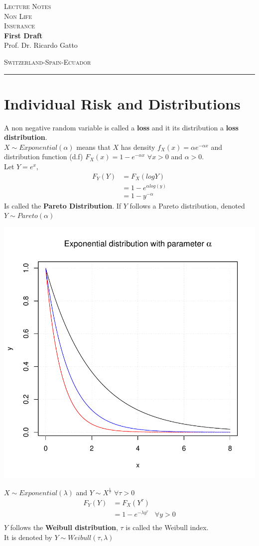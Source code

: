 \documentclass[11pt,a4paper,oneside]{article}
\newcommand*{\titleBOOK}{\begingroup
\centering
\vspace*{\baselineskip}
\vspace*{\baselineskip}
{\Huge\scshape Lecture Notes}\\[10mm]
{\Huge\scshape Non Life  \\[5mm]
Insurance} \\ [\baselineskip]
{\Large\bfseries First Draft}\\[0.3 \textheight]
{\Large Prof. Dr. Ricardo Gatto}\\
\vfill
\begin{center}
{\scshape Switzerland-Spain-Ecuador}\\
\rule{\textwidth}{0.5pt}
\end{center}
\vspace*{\baselineskip}
\endgroup}
\begin{document}

\titleBOOK
\newpage

\tableofcontents
\newpage


\section{Individual Risk and Distributions}
A non negative random variable is called a \textbf{loss} and it its distribution a \textbf{loss distribution}.\\
$X\sim Exponential(\alpha)$ means that $X$ has density $f_X(x)=\alpha e^{-\alpha x}$ and distribution function (d.f) $F_X(x)=1-e^{-\alpha x}$ $\forall x>0$ and $\alpha>0$.\\


Let $Y=e^x$, 
\begin{align*}
F_Y(Y) &= F_X(log Y)\\
&=1-e^{\alpha log (y)}\\
&=1-y^{-\alpha}
\end{align*}
Is called the \textbf{Pareto Distribution}. If $Y$ follows a Pareto distribution, denoted  $Y\sim Pareto(\alpha)$

\includegraphics{MatematicaNoVida-examplePlot}

$X\sim Exponential (\lambda)$ and $Y\sim X^{\frac{1}{\tau}}$ $\forall \tau>0$
\begin{align*}
F_Y(Y) &= F_X(Y^{\tau})\\
&=1-e^{-\lambda y^{\tau}} \ \ \ \ \forall y>0\\
\end{align*}
$Y$ follows the \textbf{Weibull distribution}, $\tau$ is called the Weibull index.\\ It is denoted by $Y\sim Weibull(\tau,\lambda)$
\end{document}
